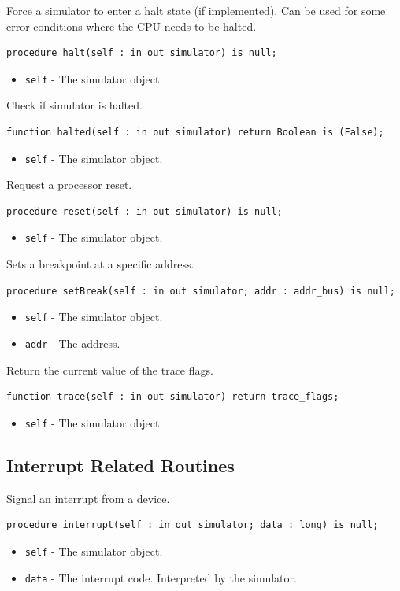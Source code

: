 \documentclass[10pt, openany]{book}
\newcommand{\keyword}[1]{\texttt{#1}}
\begin{document}
Force a simulator to enter a halt state (if implemented).
Can be used for some error conditions where the CPU needs to be halted.
\begin{lstlisting}
procedure halt(self : in out simulator) is null;
\end{lstlisting}
\begin{itemize}
  \item \keyword{self} - The simulator object.
\end{itemize}

Check if simulator is halted.
\begin{lstlisting}
function halted(self : in out simulator) return Boolean is (False);
\end{lstlisting}
\begin{itemize}
  \item \keyword{self} - The simulator object.
\end{itemize}

Request a processor reset.
\begin{lstlisting}
procedure reset(self : in out simulator) is null;
\end{lstlisting}
\begin{itemize}
  \item \keyword{self} - The simulator object.
\end{itemize}

Sets a breakpoint at a specific address.
\begin{lstlisting}
procedure setBreak(self : in out simulator; addr : addr_bus) is null;
\end{lstlisting}
\begin{itemize}
  \item \keyword{self} - The simulator object.
  \item \keyword{addr} - The address.
\end{itemize}

Return the current value of the trace flags.
\begin{lstlisting}
function trace(self : in out simulator) return trace_flags;
\end{lstlisting}
\begin{itemize}
  \item \keyword{self} - The simulator object.
\end{itemize}

\subsection{Interrupt Related Routines}
Signal an interrupt from a device.
\begin{lstlisting}
procedure interrupt(self : in out simulator; data : long) is null;
\end{lstlisting}
\begin{itemize}
  \item \keyword{self} - The simulator object.
  \item \keyword{data} - The interrupt code.  Interpreted by the simulator.
\end{itemize}
\end{document}
